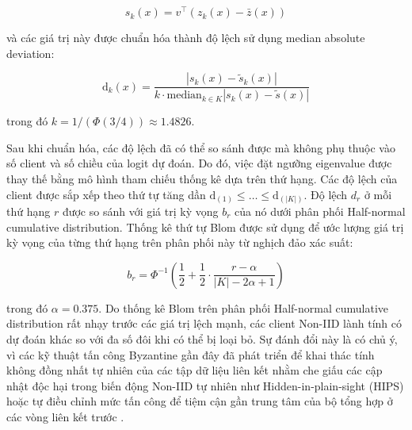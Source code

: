 $$s_k(x) = v^\top(z_k(x) - \bar z(x))$$

và các giá trị này được chuẩn hóa thành độ lệch sử dụng median absolute deviation:

$$\mathrm{d}_k(x) = \frac{|s_k(x) - \tilde s_k(x)|}{k \cdot \text{median}_{k \in K}|s_k(x) - \tilde s(x)|}$$

trong đó $k=1/(\Phi(3/4)) \approx 1.4826$.

Sau khi chuẩn hóa, các độ lệch đã có thể so sánh được mà không phụ thuộc vào số client và số chiều của logit dự đoán. Do đó, việc đặt ngưỡng eigenvalue được thay thế bằng mô hình tham chiếu thống kê dựa trên thứ hạng. Các độ lệch của client được sắp xếp theo thứ tự tăng dần $\mathrm{d}_{(1)} \leq \ldots \leq \mathrm{d}_{(|K|)}$. Độ lệch $d_{r}$ ở mỗi thứ hạng $r$ được so sánh với giá trị kỳ vọng $b_r$ của nó dưới phân phối Half-normal cumulative distribution. Thống kê thứ tự Blom \cite{blom} được sử dụng để ước lượng giá trị kỳ vọng của từng thứ hạng trên phân phối này từ nghịch đảo xác suất:

$$b_r = \Phi^{-1}\left(\frac{1}{2} + \frac{1}{2} \cdot\frac{r-\alpha}{|K| - 2\alpha +1} \right)$$

trong đó $\alpha = 0.375$. Do thống kê Blom trên phân phối Half-normal cumulative distribution rất nhạy trước các giá trị lệch mạnh, các client Non-IID lành tính có dự đoán khác so với đa số đôi khi có thể bị loại bỏ. Sự đánh đổi này là có chủ ý, vì các kỹ thuật tấn công Byzantine gần đây đã phát triển để khai thác tính không đồng nhất tự nhiên của các tập dữ liệu liên kết nhằm che giấu các cập nhật độc hại trong biến động Non-IID tự nhiên như Hidden-in-plain-sight (HIPS) \cite{roux2025byzantine} hoặc tự điều chỉnh mức tấn công để tiệm cận gần trung tâm của bộ tổng hợp ở các vòng liên kết trước \cite{xie2025poisonedfl}.

